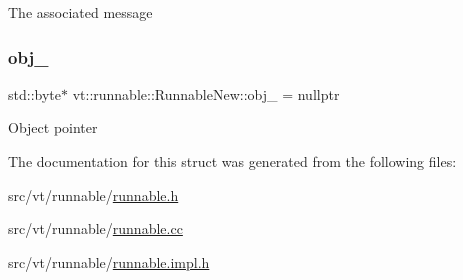 The associated message \mbox{\label{structvt_1_1runnable_1_1_runnable_new_ab0588268b7cc8acb15c705e14331ae0c}} 
\subsubsection{\texorpdfstring{obj\+\_\+}{obj\_}}
{\footnotesize\ttfamily std\+::byte$\ast$ vt\+::runnable\+::\+Runnable\+New\+::obj\+\_\+ = nullptr\hspace{0.3cm}{\ttfamily [private]}}

Object pointer 

The documentation for this struct was generated from the following files\+:\begin{DoxyCompactItemize}
\item 
src/vt/runnable/\hyperlink{runnable_8h}{runnable.\+h}\item 
src/vt/runnable/\hyperlink{runnable_8cc}{runnable.\+cc}\item 
src/vt/runnable/\hyperlink{runnable_8impl_8h}{runnable.\+impl.\+h}\end{DoxyCompactItemize}
